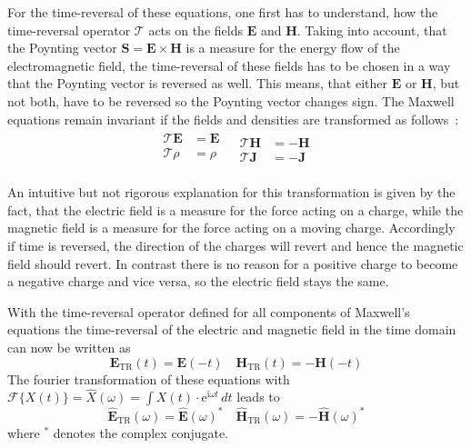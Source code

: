 For the time-reversal of these equations, one first has to understand, how the time-reversal operator \(\mathcal{T}\) acts on the fields \(\bm{E}\) and \(\bm{H}\).
Taking into account, that the Poynting vector \(\bm{S} = \bm{E} \times \bm{H}\) is a measure for the energy flow of the electromagnetic field, the time-reversal of these fields has to be chosen in a way that the Poynting vector is reversed as well.
This means, that either \(\bm{E}\) or \(\bm{H}\), but not both, have to be reversed so the Poynting vector changes sign. 
The Maxwell equations remain invariant if the fields and densities are transformed as follows~\parencite{sigwarth_time_2022}:
\begin{align}
    \begin{split}
        \mathcal{T}\bm{E} &= \bm{E} \\
        \mathcal{T}\rho &= \rho \\
    \end{split}
    &
    \begin{split}
        \mathcal{T}\bm{H} &= -\bm{H} \\
        \mathcal{T}{\bm{J}} &= -{\bm{J}}
    \end{split}
\end{align}

An intuitive but not rigorous explanation for this transformation is given by the fact, that the electric field is a measure for the force acting on a charge, while the magnetic field is a measure for the force acting on a moving charge. 
Accordingly if time is reversed, the direction of the charges will revert and hence the magnetic field should revert. 
In contrast there is no reason for a positive charge to become a negative charge and vice versa, so the electric field stays the same.


With the time-reversal operator defined for all components of Maxwell's equations the time-reversal of the electric and magnetic field in the time domain can now be written as
\begin{equation}
    \bm{E}_{\text{TR}}(t) = \bm{E}(-t) \quad \bm{H}_{\text{TR}}(t) = -\bm{H}(-t)
\end{equation}
The fourier transformation of these equations with \(\mathcal{F}\{X(t)\} = \hat{X}(\omega) = \int X(t) \cdot \mathrm{e}^{\mathrm{i}\omega t} \, dt\) leads to
\begin{equation}
    \hat{\bm{E}}_{\text{TR}}(\omega) = \hat{\bm{E}}{(\omega)}^* \quad \hat{\bm{H}}_{\text{TR}}(\omega) = -\hat{\bm{H}}{(\omega)}^*
\end{equation}
where \(^*\) denotes the complex conjugate. 

